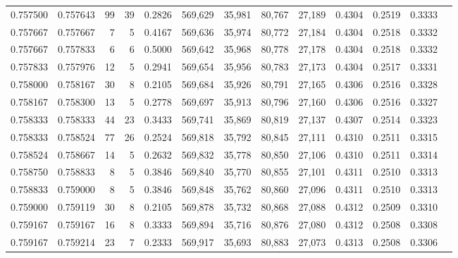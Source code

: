 \begin{tabular}{rrrrrrrrrrrrr}
0.757500 & 0.757643 &    99 &  39 &                                     0.2826 & 569,629 &  35,981 &  80,767 &  27,189 & 0.4304 & 0.2519 & 0.3333 \\
0.757667 & 0.757667 &     7 &   5 &                                     0.4167 & 569,636 &  35,974 &  80,772 &  27,184 & 0.4304 & 0.2518 & 0.3332 \\
0.757667 & 0.757833 &     6 &   6 &                                     0.5000 & 569,642 &  35,968 &  80,778 &  27,178 & 0.4304 & 0.2518 & 0.3332 \\
0.757833 & 0.757976 &    12 &   5 &                                     0.2941 & 569,654 &  35,956 &  80,783 &  27,173 & 0.4304 & 0.2517 & 0.3331 \\
0.758000 & 0.758167 &    30 &   8 &                                     0.2105 & 569,684 &  35,926 &  80,791 &  27,165 & 0.4306 & 0.2516 & 0.3328 \\
0.758167 & 0.758300 &    13 &   5 &                                     0.2778 & 569,697 &  35,913 &  80,796 &  27,160 & 0.4306 & 0.2516 & 0.3327 \\
0.758333 & 0.758333 &    44 &  23 &                                     0.3433 & 569,741 &  35,869 &  80,819 &  27,137 & 0.4307 & 0.2514 & 0.3323 \\
0.758333 & 0.758524 &    77 &  26 &                                     0.2524 & 569,818 &  35,792 &  80,845 &  27,111 & 0.4310 & 0.2511 & 0.3315 \\
0.758524 & 0.758667 &    14 &   5 &                                     0.2632 & 569,832 &  35,778 &  80,850 &  27,106 & 0.4310 & 0.2511 & 0.3314 \\
0.758750 & 0.758833 &     8 &   5 &                                     0.3846 & 569,840 &  35,770 &  80,855 &  27,101 & 0.4311 & 0.2510 & 0.3313 \\
0.758833 & 0.759000 &     8 &   5 &                                     0.3846 & 569,848 &  35,762 &  80,860 &  27,096 & 0.4311 & 0.2510 & 0.3313 \\
0.759000 & 0.759119 &    30 &   8 &                                     0.2105 & 569,878 &  35,732 &  80,868 &  27,088 & 0.4312 & 0.2509 & 0.3310 \\
0.759167 & 0.759167 &    16 &   8 &                                     0.3333 & 569,894 &  35,716 &  80,876 &  27,080 & 0.4312 & 0.2508 & 0.3308 \\
0.759167 & 0.759214 &    23 &   7 &                                     0.2333 & 569,917 &  35,693 &  80,883 &  27,073 & 0.4313 & 0.2508 & 0.3306 \\

\end{tabular}

